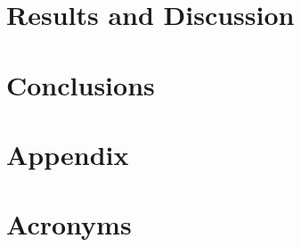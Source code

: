 \documentclass[spanish,english,12pt,letterpaper,oneside]{book}
\begin{document}
\chapter{Results and Discussion}




%


\chapter{Conclusions}
\label{conclusions}


\appendix
\chapter{Appendix}


\chapter{Acronyms}
\label{acronyms}





\backmatter



\end{document}
